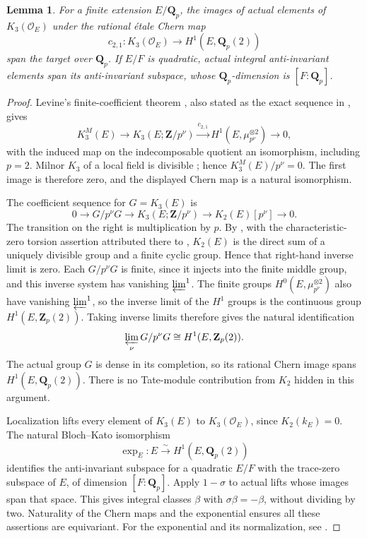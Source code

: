 \documentclass[11pt,a4paper]{amsart}
\numberwithin{equation}{section}
\newtheorem{lemma}[theorem]{Lemma}
\theoremstyle{definition}
\theoremstyle{remark}
\newcommand{\Q}{\mathbf Q}
\newcommand{\Z}{\mathbf Z}
\newcommand{\OO}{\mathcal O}
\begin{document}
\begin{lemma}\label{d3:lem:actuallocal}
For a finite extension $E/\Q_p$, the images of actual elements of $K_3(\OO_E)$ under the rational \'etale Chern map
\[
c_{2,1}:K_3(\OO_E)\longrightarrow H^1(E,\Q_p(2))
\]
span the target over $\Q_p$. If $E/F$ is quadratic, actual integral anti-invariant elements span its anti-invariant subspace, whose $\Q_p$-dimension is $[F:\Q_p]$.
\end{lemma}
\begin{proof}
Levine's finite-coefficient theorem \cite[Theorem~4.12]{LevineIndK3}, also stated as the exact sequence in \cite[Section~5]{WeibelChern}, gives
\[
K_3^M(E)\longrightarrow K_3(E;\Z/p^\nu)
\xrightarrow{c_{2,1}}H^1(E,\mu_{p^\nu}^{\otimes2})\longrightarrow0,
\]
with the induced map on the indecomposable quotient an isomorphism, including $p=2$. Milnor $K_3$ of a local field is divisible \cite[Chapter~III, Exercise~7.4]{Weibel}; hence $K_3^M(E)/p^\nu=0$. The first image is therefore zero, and the displayed Chern map is a natural isomorphism.

The coefficient sequence for $G=K_3(E)$ is
\cite[IV, Section~2]{Weibel}
\[
0\longrightarrow G/p^\nu G\longrightarrow K_3(E;\Z/p^\nu)
\longrightarrow K_2(E)[p^\nu]\longrightarrow0.
\]
The transition on the right is multiplication by $p$. By \cite[III, Theorem~6.2.4]{Weibel}, with the characteristic-zero torsion assertion attributed there to \cite{MerkurjevTorsion}, $K_2(E)$ is the direct sum of a uniquely divisible group and a finite cyclic group. Hence that right-hand inverse limit is zero. Each $G/p^\nu G$ is finite, since it injects into the finite middle group, and this inverse system has vanishing $\varprojlim^1$. The finite groups $H^0(E,\mu_{p^\nu}^{\otimes2})$ also have vanishing $\varprojlim^1$, so the inverse limit of the $H^1$ groups is the continuous group $H^1(E,\Z_p(2))$. Taking inverse limits therefore gives the natural identification
\[
\varprojlim_\nu G/p^\nu G\cong H^1(E,\Z_p(2)).
\]
The actual group $G$ is dense in its completion, so its rational Chern image spans $H^1(E,\Q_p(2))$. There is no Tate-module contribution from $K_2$ hidden in this argument.

Localization lifts every element of $K_3(E)$ to $K_3(\OO_E)$, since $K_2(k_E)=0$. The natural Bloch--Kato isomorphism
\[
\exp_E:E\xrightarrow{\sim}H^1(E,\Q_p(2))
\]
identifies the anti-invariant subspace for a quadratic $E/F$ with the trace-zero subspace of $E$, of dimension $[F:\Q_p]$. Apply $1-\sigma$ to actual lifts whose images span that space. This gives integral classes $\beta$ with $\sigma\beta=-\beta$, without dividing by two. Naturality of the Chern maps and the exponential ensures all these assertions are equivariant. For the exponential and its normalization, see \cite[Section~1.3]{HuberKings}.
\end{proof}
\end{document}

